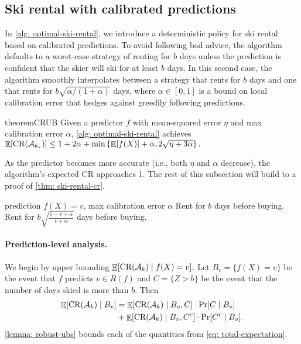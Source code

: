 \subsection{Ski rental with calibrated predictions}
In \cref{alg: optimal-ski-rental}, we introduce a deterministic policy for ski rental based on calibrated predictions. To avoid following bad advice, the algorithm defaults to a worst-case strategy of renting for $b$ days unless the prediction is confident that the skier will ski for at least $b$ days. In this second case, the algorithm smoothly interpolates between a strategy that rents for $b$ days and one that rents for $b \sqrt{\alpha/(1+\alpha)}$ days, where $\alpha \in [0,1]$ is a bound on local calibration error that hedges against greedily following predictions.

\begin{restatable}{theorem}{CRUB}
\label{thm: ski-rental-cr}
Given a predictor $f$ with mean-squared error $\eta$ and max calibration error $\alpha$, \cref{alg: optimal-ski-rental} achieves
$\mathop{\mathbb{E}}[\textnormal{CR}(\mathcal{A}_{k_*})]\leq 1+2\alpha +\min\left\{\mathop{\mathbb{E}}[f(X)]+\alpha, 2\sqrt{\eta + 3\alpha} \right\}.$
\end{restatable}

As the predictor becomes more accurate (i.e., both $\eta$ and $\alpha$ decrease), the algorithm's expected CR approaches 1. The rest of this subsection will build to a proof of \cref{thm: ski-rental-cr}.

\begin{algorithm}[t]
   \caption{$\cA_{k_*}$}
    \label{alg: optimal-ski-rental}
\begin{algorithmic}
    prediction $f(X)=v$, max calibration error $\alpha$
   \STATE Rent for $b$ days before buying.
   \ELSE
   \STATE Rent for $b \sqrt{\frac{1-v+\alpha}{v+\alpha}}$ days before buying.
   \ENDIF
\end{algorithmic}
\end{algorithm}
\paragraph{Prediction-level analysis.} We begin by upper bounding $\mathop{\mathbb{E}}[\textnormal{CR}(\mathcal{A}_k) \mid f(X)=v]$. Let $B_v = \{f(X)=v\}$ be the event that $f$ predicts $v \in R(f)$ and $C = \{Z > b\}$ be the event that the number of days skied is more than $b$. Then
\begin{align}\label{eq: total-expectation}
    \mathop{\mathbb{E}}[\textnormal{CR}(\mathcal{A}_k)\mid B_v] &= \mathop{\mathbb{E}}[\textnormal{CR}(\mathcal{A}_k) \mid B_v, C] \cdot\Pr[C \mid B_v]  \\
    &+ \mathop{\mathbb{E}}[\textnormal{CR}(\mathcal{A}_k) \mid B_v, C^c] \cdot\Pr[C^c \mid B_v]. \notag
\end{align}
\cref{lemma: robust-ubs} bounds each of the quantities from \cref{eq: total-expectation}. 

